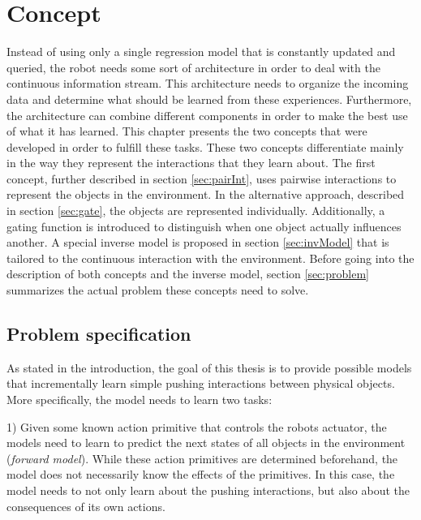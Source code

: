 \chapter{Concept \label{chap:concept}}



Instead of using only a single regression model that is constantly updated and queried, the robot needs some sort of architecture in order to deal with the continuous information stream. This architecture needs to organize the incoming data and determine what should be learned from these experiences. Furthermore, the architecture can combine different components in order to make the best use of what it has learned. 
This chapter presents the two concepts that were developed in order to fulfill these tasks. These two concepts differentiate mainly in the way they represent the interactions that they learn about. The first concept, further described in section \ref{sec:pairInt}, uses pairwise interactions to represent the objects in the environment. In the alternative approach, described in section \ref{sec:gate}, the objects are represented individually. Additionally, a gating function is introduced to distinguish when one object actually influences another. 
A special inverse model is proposed in section \ref{sec:invModel} that is tailored to the continuous interaction with the environment. %
Before going into the description of both concepts and the inverse model, section \ref{sec:problem} summarizes the actual problem these concepts need to solve. 

\section{Problem specification \label{sec:problem}}

As stated in the introduction, the goal of this thesis is to provide possible models that incrementally learn simple pushing interactions between physical objects. 
More specifically, the model needs to learn two tasks:

1) Given some known action primitive that controls the robots actuator, the models need to learn to predict the next states of all objects in the environment (\textit{forward model}). 
While these action primitives are determined beforehand, the model does not necessarily know the effects of the primitives. In this case, the model needs to not only learn about the pushing interactions, but also about the consequences of its own actions.

